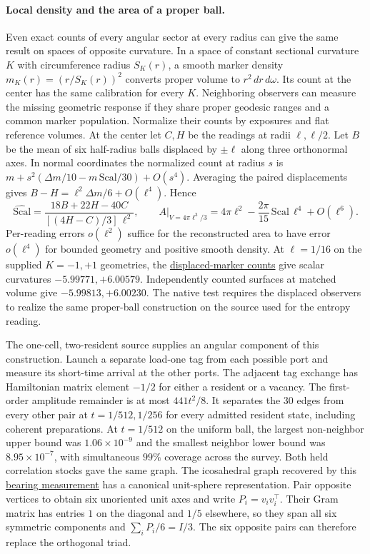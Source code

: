 \documentclass[11pt]{article}
\begin{document}
\paragraph{Local density and the area of a proper ball.}
Even exact counts of every angular sector at every radius can give the
same result on spaces of opposite curvature. In a space of constant
sectional curvature $K$ with circumference radius $S_K(r)$, a smooth
marker density $m_K(r)=(r/S_K(r))^2$ converts proper volume to
$r^2\,dr\,d\omega$. Its count at the center has the same calibration
for every $K$. Neighboring observers can measure the missing geometric
response if they share proper geodesic ranges and a common marker
population. Normalize their counts by exposures and flat reference
volumes. At the center let $C,H$ be the readings at radii $\ell,\ell/2$.
Let $B$ be the mean of six half-radius balls displaced by $\pm\ell$
along three orthonormal axes. In normal coordinates the normalized
count at radius $s$ is $m+s^2(\Delta m/10-m\,\mathrm{Scal}/30)+O(s^4)$.
Averaging the paired displacements gives
$B-H=\ell^2\Delta m/6+O(\ell^4)$. Hence
\[
 \widehat{\mathrm{Scal}}
 =\frac{18B+22H-40C}{[(4H-C)/3]\,\ell^2},\qquad
 A\big|_{V=4\pi\ell^3/3}
 =4\pi\ell^2-\frac{2\pi}{15}\,\mathrm{Scal}\,\ell^4+O(\ell^6).
\]
Per-reading errors $o(\ell^2)$ suffice for the reconstructed area to
have error $o(\ell^4)$ for bounded geometry and positive smooth density.
At $\ell=1/16$ on the supplied $K=-1,+1$ geometries, the
\href{https://github.com/FloatingPragma/observer-patch-holography/tree/main/code/matched_einstein_limit/fixed_volume/displaced_markers}{displaced-marker counts}
give scalar curvatures $-5.99771,+6.00579$. Independently counted
surfaces at matched volume give $-5.99813,+6.00230$. The native test
requires the displaced observers to realize the same proper-ball
construction on the source used for the entropy reading.

The one-cell, two-resident source supplies an angular component of this
construction. Launch a separate load-one tag from each possible port
and measure its short-time arrival at the other ports. The adjacent tag
exchange has Hamiltonian matrix element $-1/2$ for either a resident or
a vacancy. The first-order amplitude remainder is at most $441t^2/8$.
It separates the 30 edges from every other pair at $t=1/512,1/256$ for
every admitted resident state, including coherent preparations.
At $t=1/512$ on the uniform ball, the largest non-neighbor upper bound
was $1.06\times10^{-9}$ and the smallest neighbor lower bound was
$8.95\times10^{-7}$, with simultaneous $99\%$ coverage across the
survey. Both held correlation stocks gave the same graph. The
icosahedral graph recovered by this
\href{https://github.com/FloatingPragma/observer-patch-holography/tree/main/model/experiments/interval_echo_einstein_station/equilibrium_refinement/tracer_flux/bearings}{bearing measurement}
has a canonical unit-sphere representation. Pair opposite vertices
to obtain six unoriented unit axes and write $P_i=v_i v_i^\top$.
Their Gram matrix has entries $1$ on the diagonal and $1/5$ elsewhere,
so they span all six symmetric components and $\sum_i P_i/6=I/3$.
The six opposite pairs can therefore replace the orthogonal triad.
\end{document}
